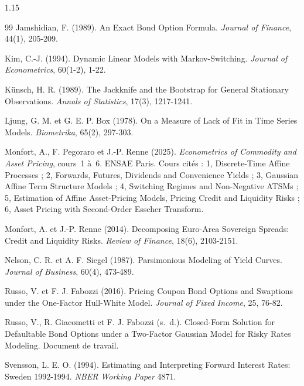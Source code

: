 \begin{spacing}{1.15}
\begin{thebibliography}{99}
Jamshidian, F. (1989). An Exact Bond Option Formula. \emph{Journal of Finance}, 44(1), 205-209.

Kim, C.-J. (1994). Dynamic Linear Models with Markov-Switching. \emph{Journal of Econometrics}, 60(1-2), 1-22.

Künsch, H. R. (1989). The Jackknife and the Bootstrap for General Stationary Observations. \emph{Annals of
Statistics}, 17(3), 1217-1241.

Ljung, G. M. et G. E. P. Box (1978). On a Measure of Lack of Fit in Time Series Models. \emph{Biometrika}, 65(2),
297-303.

Monfort, A., F. Pegoraro et J.-P. Renne (2025). \emph{Econometrics of Commodity and Asset Pricing}, cours~1 à~6.
ENSAE Paris. Cours cités : 1, Discrete-Time Affine Processes ; 2, Forwards, Futures, Dividends and Convenience
Yields ; 3, Gaussian Affine Term Structure Models ; 4, Switching Regimes and Non-Negative ATSMs ; 5, Estimation of
Affine Asset-Pricing Models, Pricing Credit and Liquidity Risks ; 6, Asset Pricing with Second-Order Esscher
Transform.

Monfort, A. et J.-P. Renne (2014). Decomposing Euro-Area Sovereign Spreads: Credit and Liquidity Risks.
\emph{Review of Finance}, 18(6), 2103-2151.

Nelson, C. R. et A. F. Siegel (1987). Parsimonious Modeling of Yield Curves. \emph{Journal of Business}, 60(4),
473-489.

Russo, V. et F. J. Fabozzi (2016). Pricing Coupon Bond Options and Swaptions under the One-Factor Hull-White
Model. \emph{Journal of Fixed Income}, 25, 76-82.

Russo, V., R. Giacometti et F. J. Fabozzi (s.~d.). Closed-Form Solution for Defaultable Bond Options under a
Two-Factor Gaussian Model for Risky Rates Modeling. Document de travail.

Svensson, L. E. O. (1994). Estimating and Interpreting Forward Interest Rates: Sweden 1992-1994. \emph{NBER
Working Paper} 4871.

\end{thebibliography}
\end{spacing}
